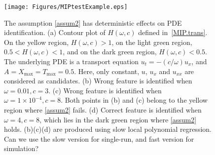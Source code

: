 \documentclass[a4paper,11pt]{article}
\begin{document}
       

\begin{figure}
\centering
\texttt{[image: Figures/MIPtestExample.eps]}
\caption{The assumption \eqref{assum2} has deterministic effects on PDE identification. (a) Contour plot of $H(\omega,c)$ defined in~\eqref{MIP.trans}. On the yellow region, $H(\omega,c)>1$, on the light green region,  $0.5<H(\omega,c)<1$, and on the dark green region, $H(\omega,c)<0.5$. The underlying PDE is a transport equation $u_t=-(c/\omega)u_x$, and $A=X_{\max}=T_{\max}=0.5$. Here, only constant, $u$, $u_x$ and $u_{xx}$ are considered as candidates.  (b) Wrong feature is identified when $\omega=0.01,c=3$.  (c) Wrong feature is identified when $\omega=1\times10^{-4},c=8$. Both points in (b) and (c) belong to the yellow region where \eqref{assum2} fails. (d) Correct feature is identified when $\omega=4,c=8$, which lies in the dark green region where \eqref{assum2} holds. {\color{red} (b)(c)(d) are produced using slow  local polynomial regression. Can we use the slow version for single-run, and fast version for simulation?}}	\label{MIPtestExample}
\end{figure}
\end{document}
